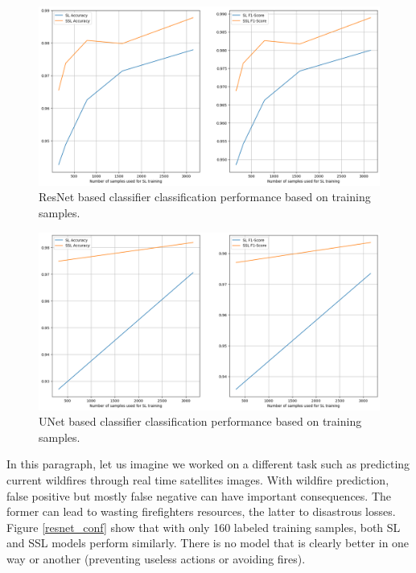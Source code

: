 \documentclass{article}
\begin{document}
\begin{figure}[]
    \centering
    \includegraphics[width=15cm]{img/resnet.png}
    \caption{ResNet based classifier classification performance based on training samples.}
    \label{resnet_m}
\end{figure}

\begin{figure}[]
    \centering
    \includegraphics[width=15cm]{img/unet.png}
    \caption{UNet based classifier classification performance based on training samples.}
    \label{unet_m}
\end{figure}

In this paragraph, let us imagine we worked on a different task such as predicting current wildfires through real time satellites images. With wildfire prediction, false positive but mostly false negative can have important consequences. The former can lead to wasting firefighters resources, the latter to disastrous losses. Figure \ref{resnet_conf} show that with only 160 labeled training samples, both SL and SSL models perform similarly. There is no model that is clearly better in one way or another (preventing useless actions or avoiding fires). 
\end{document}
